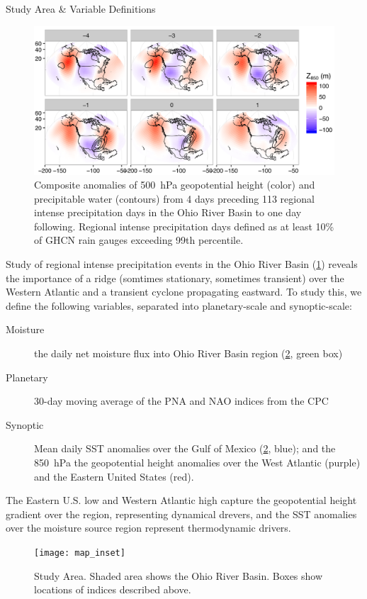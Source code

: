 \begin{block}{Study Area \& Variable Definitions}
    \begin{figure}
        \centering
        \includegraphics[width=\columnwidth]{../FigExternal/djf_composites}
        \caption{Composite anomalies of \SI{500}{\hecto\pascal} geopotential height (color) and precipitable water (contours) from 4 days preceding 113 regional intense precipitation days in the Ohio River Basin to one day following. Regional intense precipitation days defined as at least 10\% of GHCN rain gauges exceeding 99th percentile.}
        \label{fig:djf-composites}
    \end{figure}
    Study of regional intense precipitation events in the Ohio River Basin (\cref{fig:djf-composites}) reveals the importance of a ridge (somtimes stationary, sometimes transient) over the Western Atlantic and a transient cyclone propagating eastward.
    To study this, we define the following variables, separated into planetary-scale and synoptic-scale:
    \begin{description}
        \item[Moisture] the daily net moisture flux into Ohio River Basin region (\cref{fig:study-area}, green box)
        \item[Planetary] 30-day moving average of the PNA and NAO indices from the CPC
        \item[Synoptic] Mean daily SST anomalies over the Gulf of Mexico (\cref{fig:study-area}, blue); and the \SI{850}{\hecto\pascal} the geopotential height anomalies over the West Atlantic (purple) and the Eastern United States (red).
    \end{description}
    The Eastern U.S. low and Western Atlantic high capture the geopotential height gradient over the region, representing dynamical drevers, and the SST anomalies over the moisture source region \cite[see][and references therein]{Steinschneider2016a} represent thermodynamic drivers.
    \begin{figure}
        \centering
        \texttt{[image: map\_inset]}
        \caption{Study Area. Shaded area shows the Ohio River Basin. Boxes show locations of indices described above.}
        \label{fig:study-area}
    \end{figure}
\end{block}

